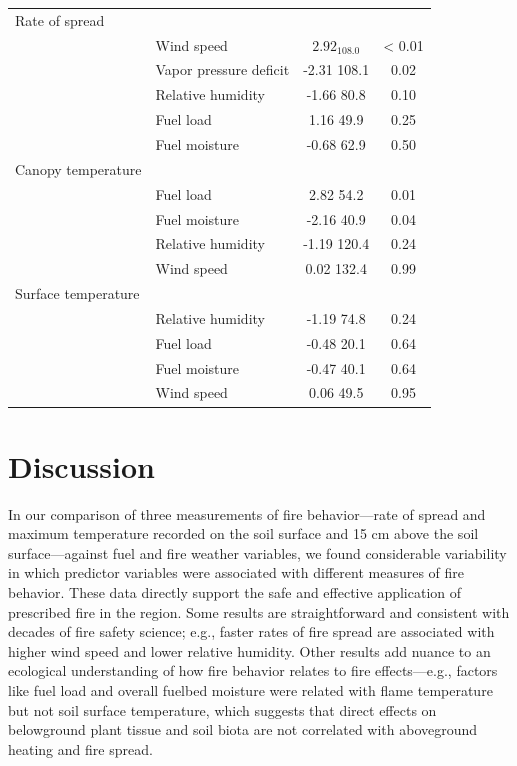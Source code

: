 \documentclass[referee, 
		     sn-basic]{sn-jnl}
\begin{document}
\begin{linenumbers}
\begin{table}
\begin{tabular}{llcc}
Rate of spread & & & \\
& Wind speed & $2.92_{108.0}$ & \textless{} 0.01 \\
& Vapor pressure deficit & -2.31 108.1 & 0.02 \\
& Relative humidity & -1.66 80.8 & 0.10 \\
& Fuel load & 1.16 49.9 & 0.25 \\
& Fuel moisture & -0.68 62.9 & 0.50 \\
Canopy temperature & & & \\
& Fuel load & 2.82 54.2 & 0.01 \\
& Fuel moisture & -2.16 40.9 & 0.04 \\
& Relative humidity & -1.19 120.4 & 0.24 \\
& Wind speed & 0.02 132.4 & 0.99 \\
Surface temperature & & & \\
& Relative humidity & -1.19 74.8 & 0.24 \\
& Fuel load & -0.48 20.1 & 0.64 \\
& Fuel moisture & -0.47 40.1 & 0.64 \\
& Wind speed & 0.06 49.5 & 0.95 \\
\bottomrule
\end{tabular}
\end{table}

\hypertarget{discussion}{%
\section{Discussion}\label{discussion}}

In our comparison of three measurements of fire behavior---rate of spread and maximum temperature recorded on the soil surface and 15 cm
above the soil surface---against fuel and fire weather variables, we
found considerable variability in which predictor variables were
associated with different measures of fire behavior. These data directly
support the safe and effective application of prescribed fire in the
region. Some results are straightforward and consistent with decades of
fire safety science; e.g., faster rates of fire spread are associated
with higher wind speed and lower relative humidity. Other results add
nuance to an ecological understanding of how fire behavior relates to
fire effects---e.g., factors like fuel load and overall fuelbed moisture
were related with flame temperature but not soil surface temperature,
which suggests that direct effects on belowground plant tissue and soil
biota are not correlated with aboveground heating and fire spread.


\end{linenumbers}
\end{document}
